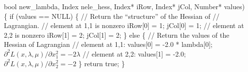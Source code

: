 \documentclass[letter,12pt]{article}
\begin{document}
\begin{itemize}
\begin{small}
{		   bool new\_lambda, Index nele\_hess, Index* iRow,
		   Index* jCol, Number* values)
\{
  if (values == NULL)
{\subitem}    \{
{\subsubitem}      // Return the ``structure'' of the Hessian of
{\subsubitem}      // Lagrangian.
{\subsubitem}      // element at 1,1 is nonzero
{\subsubitem}      iRow[0] = 1; jCol[0] = 1;
{\subsubitem}      // element at 2,2 is nonzero
{\subsubitem}      iRow[1] = 2; jCol[1] = 2;
{\subitem}    \}
{\subitem}  else 
{\subitem}    \{
{\subsubitem}      // Return the values of the Hessian of Lagrangian
{\subsubitem}      // element at 1,1: 
{\subsubitem}      values[0] = -2.0 * lambda[0]; $\partial^2 L(x,\lambda,\mu)/ \partial x_1^2=-2\lambda$
{\subsubitem}      // element at 2,2: 
{\subsubitem}      values[1] = -2.0; $\partial^2 L(x,\lambda,\mu)/ \partial x_2^2=-2$
{\subitem}    \}
{\subitem}  return true;
\}
}
\end{small}

\end{itemize}
\end{document}
